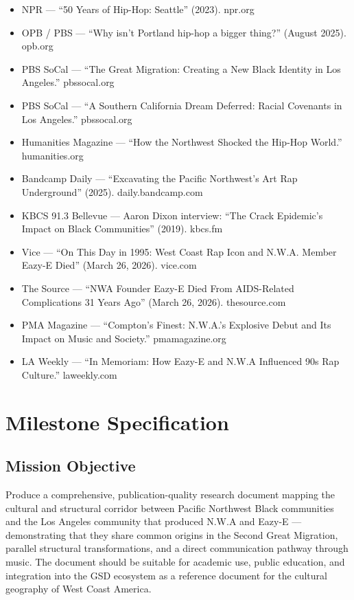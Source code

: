 \documentclass[11pt,letterpaper]{article}
\newcommand{\stageheader}[2]{%
  \noindent\colorbox{#2}{\makebox[\textwidth][l]{%
    \textcolor{white}{\bfseries\sffamily\hspace{6pt}#1\hspace{6pt}}}}%
  \vspace{0.5em}\par%
}
\begin{document}
\begin{itemize}[leftmargin=1.5em]
  \item NPR --- ``50 Years of Hip-Hop: Seattle'' (2023). npr.org
  \item OPB / PBS --- ``Why isn't Portland hip-hop a bigger thing?'' (August 2025). opb.org
  \item PBS SoCal --- ``The Great Migration: Creating a New Black Identity in Los Angeles.'' pbssocal.org
  \item PBS SoCal --- ``A Southern California Dream Deferred: Racial Covenants in Los Angeles.'' pbssocal.org
  \item Humanities Magazine --- ``How the Northwest Shocked the Hip-Hop World.'' humanities.org
  \item Bandcamp Daily --- ``Excavating the Pacific Northwest's Art Rap Underground'' (2025). daily.bandcamp.com
  \item KBCS 91.3 Bellevue --- Aaron Dixon interview: ``The Crack Epidemic's Impact on Black Communities'' (2019). kbcs.fm
  \item Vice --- ``On This Day in 1995: West Coast Rap Icon and N.W.A. Member Eazy-E Died'' (March 26, 2026). vice.com
  \item The Source --- ``NWA Founder Eazy-E Died From AIDS-Related Complications 31 Years Ago'' (March 26, 2026). thesource.com
  \item PMA Magazine --- ``Compton's Finest: N.W.A.'s Explosive Debut and Its Impact on Music and Society.'' pmamagazine.org
  \item LA Weekly --- ``In Memoriam: How Eazy-E and N.W.A Influenced 90s Rap Culture.'' laweekly.com
\end{itemize}

\newpage

\stageheader{STAGE 3 --- MISSION PACKAGE}{tertiary}

\section{Milestone Specification}

\subsection{Mission Objective}

Produce a comprehensive, publication-quality research document mapping the cultural and structural corridor between Pacific Northwest Black communities and the Los Angeles community that produced N.W.A and Eazy-E --- demonstrating that they share common origins in the Second Great Migration, parallel structural transformations, and a direct communication pathway through music. The document should be suitable for academic use, public education, and integration into the GSD ecosystem as a reference document for the cultural geography of West Coast America.
\end{document}
